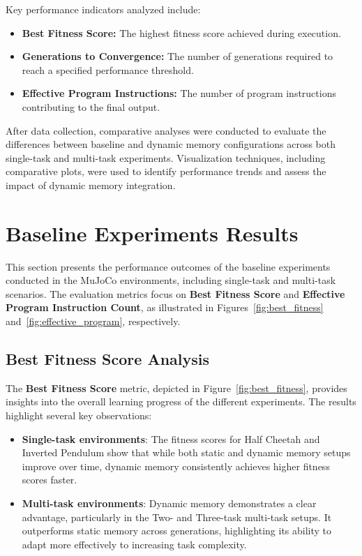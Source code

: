 \documentclass[sigconf]{acmart}
\begin{document}
Key performance indicators analyzed include:

\begin{itemize}
  \item \textbf{Best Fitness Score:} The highest fitness score achieved during execution.
  \item \textbf{Generations to Convergence:} The number of generations required to reach a specified performance threshold.
  \item \textbf{Effective Program Instructions:} The number of program instructions contributing to the final output.
\end{itemize}

After data collection, comparative analyses were conducted to evaluate the differences between baseline and dynamic memory configurations
across both single-task and multi-task experiments. Visualization techniques, including comparative plots, were used to identify performance
trends and assess the impact of dynamic memory integration.

\section{Baseline Experiments Results}
This section presents the performance outcomes of the baseline experiments conducted in 
the MuJoCo environments, including single-task and multi-task scenarios. The evaluation 
metrics focus on \textbf{Best Fitness Score} and \textbf{Effective Program Instruction Count}, as illustrated in 
Figures~\ref{fig:best_fitness} and~\ref{fig:effective_program}, respectively.

\subsection{Best Fitness Score Analysis}
The \textbf{Best Fitness Score} metric, depicted in Figure~\ref{fig:best_fitness}, provides insights into the overall 
learning progress of the different experiments. The results highlight several key observations:

\begin{itemize}
  \item \textbf{Single-task environments}: The fitness scores for Half Cheetah and Inverted Pendulum show that while both static and dynamic memory setups improve over time, dynamic memory consistently achieves higher fitness scores faster.
  \item \textbf{Multi-task environments}: Dynamic memory demonstrates a clear advantage, particularly in the Two- and Three-task multi-task setups. It outperforms static memory across generations, highlighting its ability to adapt more effectively to increasing task complexity.
\end{itemize}
\end{document}
